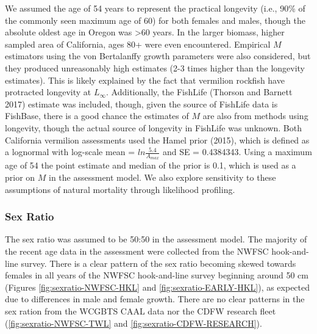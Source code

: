 \documentclass[11pt,
  english,
  a4paper,
]{article}
\begin{document}
We assumed the age of 54 years to represent the practical longevity (i.e., 90\% of the commonly seen maximum age of 60) for both females and males, though the absolute oldest age in Oregon was \textgreater60 years. In the larger biomass, higher sampled area of California, ages 80+ were even encountered. Empirical {\(M\)\leavevmode\tagmcend\tagstructend} estimators using the von Bertalanffy growth parameters were also considered, but they produced unreasonably high estimates (2-3 times higher than the longevity estimates). This is likely explained by the fact that vermilion rockfish have protracted longevity at {\(L_{\infty}\)\leavevmode\tagmcend\tagstructend}. Additionally, the FishLife {(Thorson and Barnett 2017)\leavevmode\tagmcend\tagstructend} estimate was included, though, given the source of FishLife data is FishBase, there is a good chance the estimates of {\(M\)\leavevmode\tagmcend\tagstructend} are also from methods using longevity, though the actual source of longevity in FishLife was unknown. Both California vermilion assessments used the Hamel prior {(2015)\leavevmode\tagmcend\tagstructend}, which is defined as a lognormal with log-scale mean = {\(ln\frac{5.4}{A_{max}}\)\leavevmode\tagmcend\tagstructend} and SE = 0.4384343. Using a maximum age of 54 the point estimate and median of the prior is 0.1, which is used as a prior on {\(M\)\leavevmode\tagmcend\tagstructend} in the assessment model. We also explore sensitivity to these assumptions of natural mortality through likelihood profiling.


\hypertarget{sex-ratio}{%
\subsubsection{Sex Ratio}\label{sex-ratio}}

\leavevmode\tagmcend\tagstructend

The sex ratio was assumed to be 50:50 in the assessment model. The majority of the recent age data in the assessment were collected from the NWFSC hook-and-line survey. There is a clear pattern of the sex ratio becoming skewed towards females in all years of the NWFSC hook-and-line survey beginning around 50 cm (Figures \ref{fig:sexratio-NWFSC-HKL} and \ref{fig:sexratio-EARLY-HKL}), as expected due to differences in male and female growth. There are no clear patterns in the sex ration from the WCGBTS CAAL data nor the CDFW research fleet (\ref{fig:sexratio-NWFSC-TWL} and \ref{fig:sexratio-CDFW-RESEARCH}).
\end{document}
